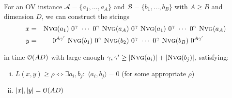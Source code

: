 \begin{theorem}
\label{thm:small_lcs_construction}
	For an OV instance $\mathcal{A} = \{a_1, \ldots, a_A\}$ and $\mathcal{B} = \{b_1, \ldots, b_B\}$ with $A \geq B$ and dimension $D$, we can construct the strings
\begin{align*}
	x &=& \nvg{a_1}\ 0^\gamma\ \cdots\ 0^\gamma\ \nvg{a_A}\ &0^\gamma\ %
	\nvg{a_1}\ 0^\gamma\ \cdots\ 0^\gamma\ \nvg{a_A}\\
	y&=& 0^{A\gamma'}\ \nvg{b_1}\ 0^{\gamma}\ \nvg{b_2}\ &0^\gamma\ \cdots\ 0^\gamma\ \nvg{b_B}\ 0^{A\gamma'}
\end{align*}

in time $\mathcal{O}(AD)$ with large enough $\gamma, \gamma' \geq |\text{\textsc{Nvg}}(a_i)| + |\text{\textsc{Nvg}}(b_j)|$, satisfying:

\begin{enumerate}[(i)]
    \item\label{thm:small_lcs_construction:infer} $L(x,y) \geq \rho \Leftrightarrow \exists a_i, b_j:\; \langle a_i,b_j \rangle = 0$ \quad\quad (for some appropriate $\rho$)

    \item\label{thm:small_lcs_construction:size} $|x|, |y| = \mathcal{O}(AD)$
\end{enumerate}
\end{theorem}	




%	
%
%	
%	
%	
%	
%	

